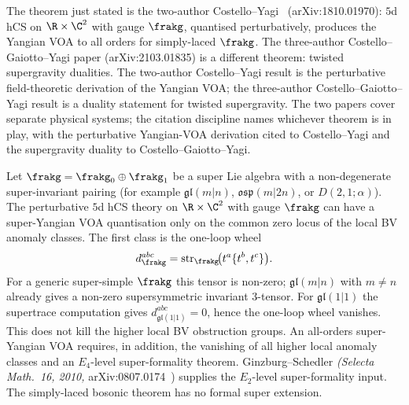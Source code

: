 \begin{remark}
\label{rem:costello-yagi-vs-cgy-distinction}
The theorem just stated is the two-author Costello--Yagi~\cite{CostelloYagi2018} \textup{(}arXiv:1810.01970\textup{):} $5$d hCS on $\R \times \C^2$ with gauge $\frakg$, quantised perturbatively, produces the Yangian VOA to all orders for simply-laced $\frakg$. The three-author Costello--Gaiotto--Yagi paper \textup{(}arXiv:2103.01835\textup{)} is a different theorem: twisted supergravity dualities. The two-author Costello--Yagi result is the perturbative field-theoretic derivation of the Yangian VOA; the three-author Costello--Gaiotto--Yagi result is a duality statement for twisted supergravity. The two papers cover separate physical systems; the citation discipline names whichever theorem is in play, with the perturbative Yangian-VOA derivation cited to Costello--Yagi and the supergravity duality to Costello--Gaiotto--Yagi.
\end{remark}

\begin{conjecture}
\label{prop:super-all-orders-open}
\ClaimStatusConjectured
Let $\frakg = \frakg_0 \oplus \frakg_1$ be a super Lie algebra with a non-degenerate super-invariant pairing \textup{(}for example $\mathfrak{gl}(m|n)$, $\mathfrak{osp}(m|2n)$, or $D(2,1;\alpha)$\textup{).} The perturbative $5$d hCS theory on $\R\times\C^2$ with gauge $\frakg$ can have a super-Yangian VOA quantisation only on the common zero locus of the local BV anomaly classes. The first class is the one-loop wheel
\[
 d^{abc}_\frakg=\operatorname{str}_{\frakg}\!\bigl(t^a\{t^b,t^c\}\bigr).
\]
For a generic super-simple $\frakg$ this tensor is non-zero; $\mathfrak{gl}(m|n)$ with $m\ne n$ already gives a non-zero supersymmetric invariant $3$-tensor. For $\mathfrak{gl}(1|1)$ the supertrace computation gives $d^{abc}_{\mathfrak{gl}(1|1)}=0$, hence the one-loop wheel vanishes. This does not kill the higher local BV obstruction groups. An all-orders super-Yangian VOA requires, in addition, the vanishing of all higher local anomaly classes and an $E_4$-level super-formality theorem. Ginzburg--Schedler \emph{(Selecta Math.~16, 2010,} arXiv:0807.0174~\cite{GinzburgSchedler2008}\textup{)} supplies the $E_2$-level super-formality input. The simply-laced bosonic theorem has no formal super extension.
\end{conjecture}

